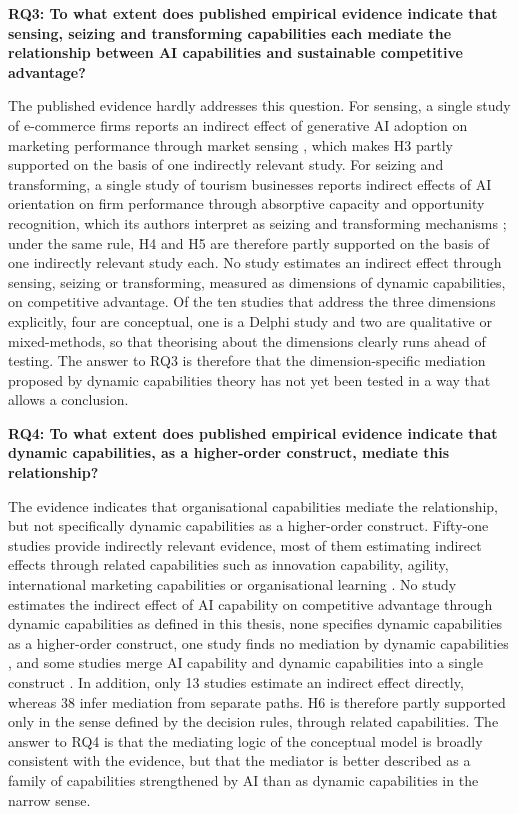 \textbf{RQ3: To what extent does published empirical evidence indicate that sensing, seizing and transforming capabilities each mediate the relationship between AI capabilities and sustainable competitive advantage?}

The published evidence hardly addresses this question. For sensing, a single study of e-commerce firms reports an indirect effect of generative AI adoption on marketing performance through market sensing \parencite{noor2026}, which makes H3 partly supported on the basis of one indirectly relevant study. For seizing and transforming, a single study of tourism businesses reports indirect effects of AI orientation on firm performance through absorptive capacity and opportunity recognition, which its authors interpret as seizing and transforming mechanisms \parencite{li2026}; under the same rule, H4 and H5 are therefore partly supported on the basis of one indirectly relevant study each. No study estimates an indirect effect through sensing, seizing or transforming, measured as dimensions of dynamic capabilities, on competitive advantage. Of the ten studies that address the three dimensions explicitly, four are conceptual, one is a Delphi study and two are qualitative or mixed-methods, so that theorising about the dimensions clearly runs ahead of testing. The answer to RQ3 is therefore that the dimension-specific mediation proposed by dynamic capabilities theory \parencite{teece2007} has not yet been tested in a way that allows a conclusion.

\textbf{RQ4: To what extent does published empirical evidence indicate that dynamic capabilities, as a higher-order construct, mediate this relationship?}

The evidence indicates that organisational capabilities mediate the relationship, but not specifically dynamic capabilities as a higher-order construct. Fifty-one studies provide indirectly relevant evidence, most of them estimating indirect effects through related capabilities such as innovation capability, agility, international marketing capabilities or organisational learning \parencite{malik2021, srahin2026, guo2025, tu2026}. No study estimates the indirect effect of AI capability on competitive advantage through dynamic capabilities as defined in this thesis, none specifies dynamic capabilities as a higher-order construct, one study finds no mediation by dynamic capabilities \parencite{kokash2026}, and some studies merge AI capability and dynamic capabilities into a single construct \parencite{ayoub2026, shao2026}. In addition, only 13 studies estimate an indirect effect directly, whereas 38 infer mediation from separate paths. H6 is therefore partly supported only in the sense defined by the decision rules, through related capabilities. The answer to RQ4 is that the mediating logic of the conceptual model is broadly consistent with the evidence, but that the mediator is better described as a family of capabilities strengthened by AI than as dynamic capabilities in the narrow sense.

